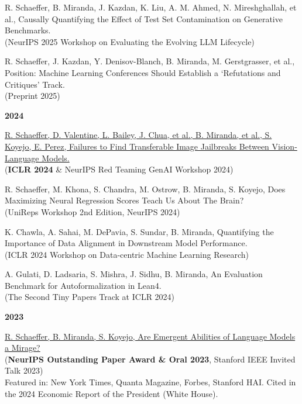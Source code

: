 \documentclass{article}
\newenvironment{changemargin}[2]{%
  \begin{list}{}{%
    \setlength{\topsep}{0pt}%
    \setlength{\leftmargin}{#1}%
    \setlength{\rightmargin}{#2}%
    \setlength{\listparindent}{\parindent}%
    \setlength{\itemindent}{\parindent}%
    \setlength{\parsep}{\parskip}%
  }%
  \item[]}{\end{list}
}
\newenvironment{body} {
	\vspace*{-16pt}
	\begin{changemargin}{-0.25in}{-0.5in}
  }	
	{\end{changemargin}
}
\begin{document}
\begin{body}
    \vspace{10pt}
    {R. Schaeffer, B. Miranda, J. Kazdan, K. Liu, A. M. Ahmed, N. Mireshghallah, et al.,
    Causally Quantifying the Effect of Test Set Contamination on Generative Benchmarks.}
    \\
    (NeurIPS 2025 Workshop on Evaluating the Evolving LLM Lifecycle)

    \vspace{10pt}
    {R. Schaeffer, J. Kazdan, Y. Denisov-Blanch, B. Miranda, M. Gerstgrasser, et al.,
    Position: Machine Learning Conferences Should Establish a `Refutations and Critiques' Track.}
    \\
    (Preprint 2025)

    \vspace{12pt}
    \textbf{\large 2024}
    \vspace{4pt}

    \vspace{10pt}
    \href{https://openreview.net/forum?id=wvFnqVVUhN}
    {R. Schaeffer, D. Valentine, L. Bailey, J. Chua, et al., B. Miranda, et al., S. Koyejo, E. Perez,
    Failures to Find Transferable Image Jailbreaks Between Vision-Language Models.}
    \\
    (\textbf{ICLR 2024} \& NeurIPS Red Teaming GenAI Workshop 2024)

    \vspace{10pt}
    {R. Schaeffer, M. Khona, S. Chandra, M. Ostrow, B. Miranda, S. Koyejo,
    Does Maximizing Neural Regression Scores Teach Us About The Brain?}
    \\
    (UniReps Workshop 2nd Edition, NeurIPS 2024)

    \vspace{10pt}
    {K. Chawla, A. Sahai, M. DePavia, S. Sundar, B. Miranda,
    Quantifying the Importance of Data Alignment in Downstream Model Performance.}
    \\
    (ICLR 2024 Workshop on Data-centric Machine Learning Research)

    \vspace{10pt}
    {A. Gulati, D. Ladsaria, S. Mishra, J. Sidhu, B. Miranda,
    An Evaluation Benchmark for Autoformalization in Lean4.}
    \\
    (The Second Tiny Papers Track at ICLR 2024)

    \vspace{12pt}
    \textbf{\large 2023}
    \vspace{4pt}

    \vspace{10pt}
    \href{https://arxiv.org/abs/2304.15004}
    {R. Schaeffer, B. Miranda, S. Koyejo,
    Are Emergent Abilities of Language Models a Mirage?}
    \\
    (\textbf{NeurIPS Outstanding Paper Award \& Oral 2023}, Stanford IEEE Invited Talk 2023)
    \\
    Featured in: New York Times, Quanta Magazine, Forbes, Stanford HAI.
    Cited in the 2024 Economic Report of the President (White House).


\end{body}
\end{document}
